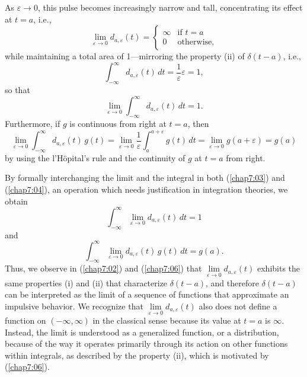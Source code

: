  
 As \(\varepsilon \to 0 \), this pulse becomes increasingly narrow and tall, concentrating its effect at \( t = a \), i.e.,  
 \begin{equation}\label{chap7:02}
 	\lim\limits_{\varepsilon\to 0} d_{a, \varepsilon}(t) = \begin{cases}
 	\infty &\mbox{if } t=a\\
 	0&\text{otherwise},
 \end{cases}\end{equation}
 while maintaining a total area of 1—mirroring the property (ii) of \( \delta(t - a) \), i.e.,
 \[\int_{-\infty}^\infty d_{a, \varepsilon}(t) \, dt = \frac{1}{\varepsilon} \varepsilon=1,\]
 so that 
 \begin{equation}\label{chap7:03}
 	\lim\limits_{\varepsilon\to 0} \int_{-\infty}^\infty d_{a, \varepsilon}(t) \, dt =1.
 	\end{equation}
 Furthermore, if $g$ is continuous from right at $t=a$,  then
  \begin{equation}\label{chap7:04}
 	\lim\limits_{\varepsilon\to 0} \int_{-\infty}^\infty d_{a, \varepsilon}(t) \, g(t) = 	\lim\limits_{\varepsilon\to 0}\frac{1}{\varepsilon} \int_a^{a+\varepsilon}  g(t) \, dt = \lim\limits_{\varepsilon\to 0} g(a+\varepsilon) = g(a)
 \end{equation}
by using the l'H\"opital's rule and the continuity of $g$ at $t=a$ from right. 

 By formally interchanging the limit and the integral in both (\ref{chap7:03}) and (\ref{chap7:04}), an operation which needs justification  in integration theories, we obtain  
\begin{equation}\label{chap7:05}
	\int_{-\infty}^\infty\lim\limits_{\varepsilon\to 0} d_{a, \varepsilon}(t)\, dt = 1
\end{equation}  
and 
\begin{equation}\label{chap7:06}
	 \int_{-\infty}^\infty \lim\limits_{\varepsilon\to 0} d_{a, \varepsilon}(t) \, g(t)\, dt  = g(a).
	\end{equation}
 Thus, we observe in (\ref{chap7:02}) and (\ref{chap7:06})  that  
 \( \lim\limits_{\varepsilon \to 0} d_{a, \varepsilon}(t) \) exhibits the same  properties (i) and (ii) that characterize \( \delta(t - a) \), and therefore \( \delta(t - a) \) can be interpreted as the limit of a sequence of functions that approximate an impulsive behavior.   
We recognize that 
\(
\lim\limits_{\varepsilon \to 0} d_{a, \varepsilon}(t)
\)
also does not define a function on $(-\infty, \infty)$ in the classical sense because its value at $t=a$ is $\infty.$ Instead, the limit is understood as a generalized function, or a distribution, because of the way it operates primarily through its action on other functions within integrals, as described by the property (ii), which is motivated by (\ref{chap7:06}).
 


